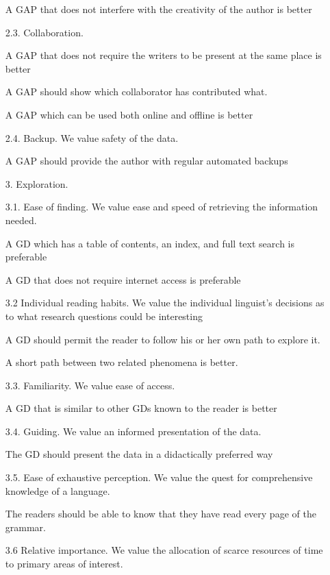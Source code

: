 \begin{enumerate}
\ea  A GAP that does not interfere with the creativity of the author is better  \z

\item[2.3.] Collaboration. 

\ea  A GAP that does not require the writers to be present at the same place is better \z

\ea  A GAP should show which collaborator has contributed what. \z

\ea  A GAP which can be used both online and offline is better  \z

\item[2.4.] Backup. We value safety of the data.

\ea  A GAP should provide the author with regular automated backups \z

\item[3.] Exploration.

\item[3.1.] Ease of finding. We value ease and speed of retrieving the information needed.

\ea  A GD which has a table of contents, an index, and full text search is preferable \z

\ea  A GD that does not require internet access is preferable \z

\item[3.2] Individual reading habits. We value the individual linguist's decisions as to what research questions could be interesting

\ea  A GD should permit the reader to follow his or her own path to explore it. \z

\ea  A short path between two related phenomena is better. \z

\item[3.3.] Familiarity. We value ease of access.

\ea  A GD that is similar to other GDs known to the reader is better \z

\item[3.4.] Guiding. We value an informed presentation of the data.

\ea  The GD should present the data in a didactically preferred way \z

\item[3.5.] Ease of exhaustive perception. We value the quest for comprehensive knowledge of a language. 

\ea  The readers should be able to know that they have read every page of the grammar. \z

\item[3.6] Relative importance. We value the allocation of scarce resources of time to primary areas of interest.


\end{enumerate}
